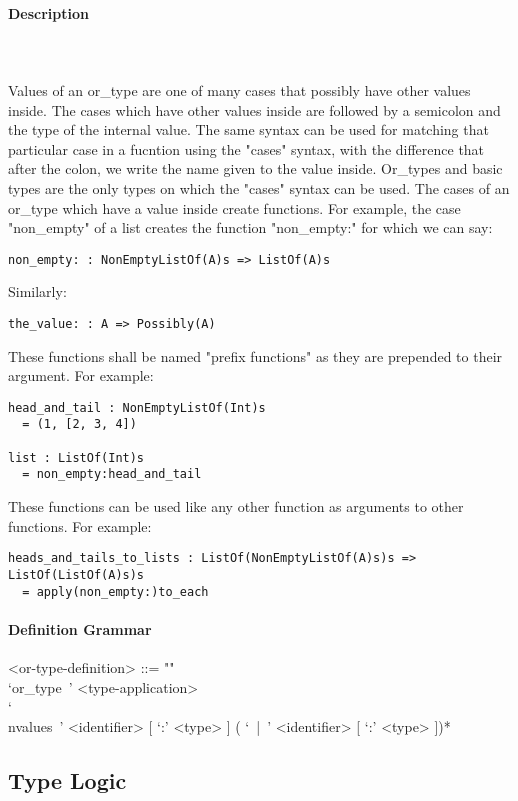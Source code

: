\documentclass{article}
\def\pend{\mbox{} \\\\}
\begin{document}
\paragraph{Description}\pend
Values of an or\_type are one of many cases that possibly have other values inside.
The cases which have other values inside are followed by a semicolon and the 
type of the internal value. The same syntax can be used for matching that particular 
case in a fucntion using the "cases" syntax, with the difference that after the
colon, we write the name given to the value inside. 
Or\_types and basic types are the only types on which
the "cases" syntax can be used. The cases of an or\_type which have a value
inside create functions. For example, the case "non\_empty" of a list creates the
function "non\_empty:" for which we can say:
\begin{verbatim}
non_empty: : NonEmptyListOf(A)s => ListOf(A)s
\end{verbatim}
Similarly:
\begin{verbatim}
the_value: : A => Possibly(A)
\end{verbatim}
These functions shall be named "prefix functions" as they are prepended to their
argument.
For example:
\begin{verbatim}
head_and_tail : NonEmptyListOf(Int)s
  = (1, [2, 3, 4])

list : ListOf(Int)s
  = non_empty:head_and_tail
\end{verbatim}
These functions can be used like any other function as arguments to other functions.
For example:
\begin{verbatim}
heads_and_tails_to_lists : ListOf(NonEmptyListOf(A)s)s => ListOf(ListOf(A)s)s
  = apply(non_empty:)to_each
\end{verbatim}

\paragraph{Definition Grammar}
\begin{grammar}
<or-type-definition> ::= ""\\
`or_type\ ' <type-application> 
\\`\\nvalues\ ' <identifier> [ `:' <type> ] ( `\ |\ ' <identifier> [ `:' <type> ])*
\end{grammar}

\subsection{Type Logic}
\label{subsec:typelogic}
\end{document}
